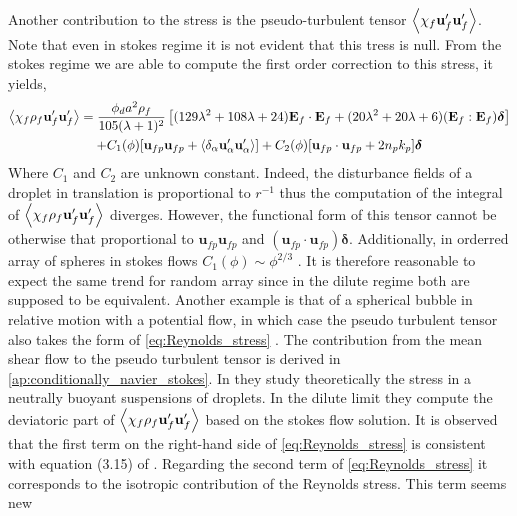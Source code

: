 Another contribution to the stress is the pseudo-turbulent tensor $\left<\chi_f \textbf{u}_f'\textbf{u}_f'\right>$. 
Note that even in stokes regime it is not evident that this tress is null. 
From the stokes regime we are able to compute the first order correction to this stress, it yields, 
\begin{multline}
    \left<\chi_f \rho_f \textbf{u}_f' \textbf{u}_f'\right>
    =
    \frac{\phi_d a^2 \rho_f}{105 (\lambda +1)^2 }\left[
        (129\lambda^2+108\lambda+24)\textbf{E}_f\cdot \textbf{E}_f
        + (20\lambda^2 +20\lambda + 6)
        (\textbf{E}_f : \textbf{E}_f)\bm\delta
    \right]\\
    + C_1(\phi) [\textbf{u}_{fp} \textbf{u}_{fp}
    + \left<\delta_\alpha \textbf{u}_\alpha'\textbf{u}_\alpha'\right> ]
    + C_2(\phi) [\textbf{u}_{fp}\cdot \textbf{u}_{fp} + 2 n_p k_p]\bm\delta
    \label{eq:Reynolds_stress}
\end{multline}
Where $C_1$ and $C_2$ are unknown constant.
Indeed, the disturbance fields of a droplet in translation is proportional to $r^{-1}$ thus the computation of the integral of $\left<\chi_f \rho_f \textbf{u}_f' \textbf{u}_f'\right>$ diverges. 
However, the functional form of this tensor cannot be otherwise that proportional to $\textbf{u}_{fp} \textbf{u}_{fp}$ and $(\textbf{u}_{fp}\cdot \textbf{u}_{fp})\bm\delta$.
Additionally, in orderred array of spheres in stokes flows $C_1(\phi) \sim \phi^{2/3}$ \citet{hill2001first}.
It is therefore reasonable to expect the same trend for random array since in the dilute regime both are supposed to be equivalent. 
Another example is that of a spherical bubble in relative motion with a potential flow, in which case the pseudo turbulent tensor also takes the form of \ref{eq:Reynolds_stress} \citep{zhang1994ensemble}. 
The contribution from the mean shear flow to the pseudo turbulent tensor is derived in \ref{ap:conditionally_navier_stokes}. 
In  \citet{raja2010inertial} they study theoretically the stress in a neutrally buoyant suspensions of droplets. 
In the dilute limit they compute the deviatoric part of $\left<\chi_f \rho_f \textbf{u}_f' \textbf{u}_f'\right>$ based on the stokes flow solution. 
It is observed that the first term on the right-hand side of \ref{eq:Reynolds_stress} is consistent with equation (3.15) of \citet{raja2010inertial}.
Regarding the second term of \ref{eq:Reynolds_stress} it corresponds to the  isotropic contribution of the Reynolds stress.
This term seems new  


